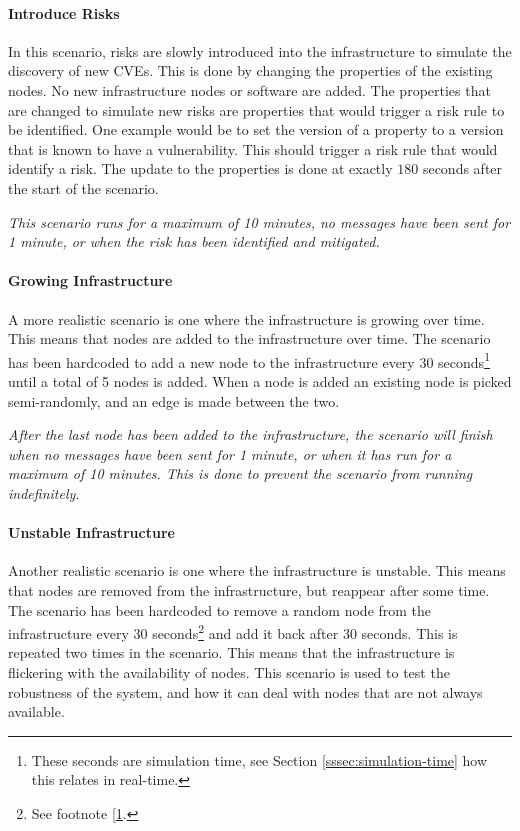 \paragraph{Introduce Risks} 
In this scenario, risks are slowly introduced into the infrastructure to simulate the discovery of new CVEs. This is done by changing the properties of the existing nodes. No new infrastructure nodes or software are added. The properties that are changed to simulate new risks are properties that would trigger a risk rule to be identified. One example would be to set the  version of a property to a version that is known to have a vulnerability. This should trigger a risk rule that would identify a risk.
The update to the properties is done at exactly $180$ seconds after the start of the scenario. 

\textit{This scenario runs for a maximum of 10 minutes, no messages have been sent for 1 minute, or when the risk has been identified and mitigated.}

\paragraph*{Growing Infrastructure}
A more realistic scenario is one where the infrastructure is growing over time. This means that nodes are added to the infrastructure over time. The scenario has been hardcoded to add a new node to the infrastructure every 30 seconds\footnote{\label{footnote:simulation-time}These seconds are simulation time, see Section \ref{sssec:simulation-time} how this relates in real-time.} until a total of 5 nodes is added. When a node is added an existing node is picked semi-randomly, and an edge is made between the two.

\textit{After the last node has been added to the infrastructure, the scenario will finish when no messages have been sent for 1 minute, or when it has run for a maximum of 10 minutes. This is done to prevent the scenario from running indefinitely.}

\paragraph*{Unstable Infrastructure}
Another realistic scenario is one where the infrastructure is unstable. This means that nodes are removed from the infrastructure, but reappear after some time. The scenario has been hardcoded to remove a random node from the infrastructure every 30 seconds\footnote{See footnote [\ref{footnote:simulation-time}.} and add it back after 30 seconds. This is repeated two times in the scenario. This means that the infrastructure is flickering with the availability of nodes. This scenario is used to test the robustness of the system, and how it can deal with nodes that are not always available.

